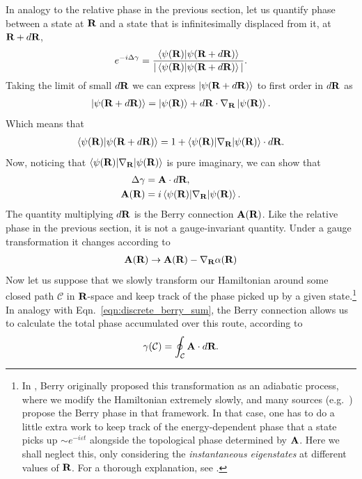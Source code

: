In analogy to the relative phase in the previous section, let us quantify phase between a state at $\textbf R$ and a state that is infinitesimally displaced from it, at $\textbf R + d \textbf R$,
\begin{align}
    e^{-i\Delta\gamma} = \frac{\braket{\psi(\textbf R)|\psi(\textbf R+d\textbf R)}}{|\braket{\psi(\textbf R)|\psi(\textbf R+d\textbf R)}|}.
\end{align}
Taking the limit of small $d\textbf R$ we can express $\ket{\psi(\textbf R+d\textbf R)}$ to first order in $d\textbf R$ as
\begin{align}
    \ket{\psi(\textbf R+d\textbf R)} = \ket{\psi(\textbf R)} + d\textbf R \cdot \nabla_{\textbf R} \ket{\psi(\textbf R)}.
\end{align}
Which means that
\begin{align}
    \braket{\psi(\textbf R)|\psi(\textbf R+d\textbf R)} = 1 + \braket{\psi(\textbf R) | \nabla _{\textbf R}|\psi(\textbf R)}\cdot d\textbf R .
\end{align}
Now, noticing that $ \braket{\psi(\textbf R) | \nabla_{\textbf R} |\psi(\textbf R)}$ is pure imaginary, we can show that
\begin{align}\label{A_def}
    \Delta \gamma &= \textbf{A} \cdot d\textbf R, \\
    \textbf{A}(\textbf R)& = i
    \braket{\psi(\textbf R) | 
    \nabla_{\textbf R} |
    \psi(\textbf R)} . \label{eqn:cont_berry_connection}
\end{align}
The quantity multiplying $d\textbf R$ is the Berry connection $\textbf{A}(\textbf R)$. Like the relative phase in the previous section, it is not a gauge-invariant quantity. Under a gauge transformation it changes according to
\begin{align} \label{eqn:gauge}
    \textbf{A}(\textbf R) \rightarrow \textbf{A}(\textbf R) - \nabla _{\textbf R} \alpha(\textbf R)
\end{align}
Now let us suppose that we slowly transform our Hamiltonian around some closed path $\mathcal C$ in $\textbf R$-space and keep track of the phase picked up by a given state.\footnote{In \cite{berry_quantal_1984}, Berry originally proposed this transformation as an adiabatic process, where we modify the Hamiltonian extremely slowly, and many sources (e.g.~\cite{xiao_berry_2010}) propose the Berry phase in that framework. In that case, one has to do a little extra work to keep track of the energy-dependent phase that a state picks up $\sim e^{-i \varepsilon t}$ alongside the topological phase determined by $\textbf A$. Here we shall neglect this, only considering the \textit{instantaneous eigenstates} at different values of $\textbf R$. For a thorough explanation, see \cite{vanderbilt_berry_2018}.} In analogy with Eqn.~\ref{eqn:discrete_berry_sum}, the Berry connection allows us to calculate the total phase accumulated over this route, according to
\begin{align} \label{eqn:flux_loop}
    \gamma(\mathcal C) = \oint_{\mathcal C} \textbf{A} \cdot d\textbf R.
\end{align} 

